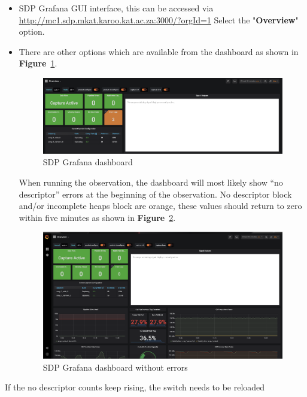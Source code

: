 \begin{itemize}
\item SDP Grafana GUI interface, this can be accessed via 	\url{http://mc1.sdp.mkat.karoo.kat.ac.za:3000/?orgId=1}  Select the "\textbf{Overview}" option. 

\item There are other options which are available from the dashboard as shown in \textbf{Figure}~\ref{fig:image11}.

\begin{figure}[H]
	\centering
	\includegraphics[scale=0.22]{Chapters/images/image11.png}
	
	\caption{SDP Grafana dashboard}
	\label{fig:image11}
\end{figure}


When running the observation, the dashboard will most likely show “no descriptor” errors at the beginning of the observation.  No descriptor block and/or incomplete heaps block are orange, these values should return to zero within five minutes as shown in \textbf{Figure}~\ref{fig:image15}.

\begin{figure}[!thb]
	\centering
	\includegraphics[scale=0.22]{Chapters/images/image15.png}
	
	\caption{SDP Grafana dashboard without  errors}
	\label{fig:image15}
\end{figure}
\end{itemize}
If the no descriptor counts keep rising, the switch needs to be reloaded

